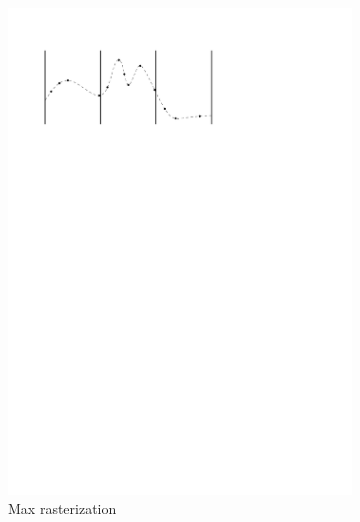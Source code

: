 \begin{figure}
\begin{subfigure}[b]{0.3\linewidth}
    \includegraphics[width=\textwidth,page=2]{figs/maxgridding.pdf}
    \caption{Max rasterization}\label{fig:fr:mg:a}
  \end{subfigure}
  \qquad
  \begin{subfigure}[b]{0.3\linewidth}
    \centering

\end{subfigure}
\end{figure}
